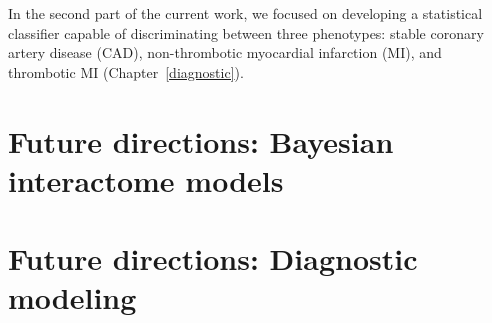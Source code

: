 \begin{DoubleSpace*}
In the second part of the current work, we focused on developing a statistical classifier capable of discriminating between three phenotypes: stable coronary artery disease (CAD), non-thrombotic myocardial infarction (MI), and thrombotic MI (Chapter~\ref{diagnostic}). 

\section{Future directions: Bayesian interactome models}

\section{Future directions: Diagnostic modeling} 

\end{DoubleSpace*}
